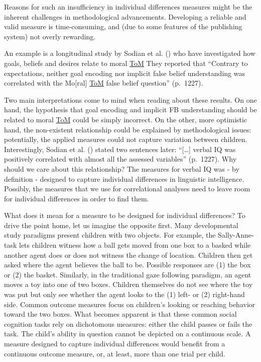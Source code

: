 \documentclass[
]{scrbook}
\begin{document}
Reasons for such an insufficiency in individual differences measures might be the inherent challenges in methodological advancements. Developing a reliable and valid measure is time-consuming, and (due to some features of the publishing system) not overly rewarding.

An example is a longitudinal study by Sodian et al. () who have investigated how goals, beliefs and desires relate to moral \hyperref[acronyms_ToM]{ToM} They reported that ``Contrary to expectations, neither goal encoding nor implicit false belief understanding was correlated with the Mo{[}ral{]} \hyperref[acronyms_ToM]{ToM} false belief question'' (p.~1227).

Two main interpretations come to mind when reading about these results. On one hand, the hypothesis that goal encoding and implicit FB understanding should be related to moral \hyperref[acronyms_ToM]{ToM} could be simply incorrect. On the other, more optimistic hand, the non-existent relationship could be explained by methodological issues: potentially, the applied measures could not capture variation between children. Interestingly, Sodian et al. () stated two sentences later: ``{[}\ldots{]} verbal IQ was positively correlated with almost all the assessed variables'' (p.~1227). Why should we care about this relationship? The measures for verbal IQ was - by definition - designed to capture individual differences in linguistic intelligence. Possibly, the measures that we use for correlational analyses need to leave room for individual differences in order to find them.

What does it mean for a measure to be designed for individual differences? To drive the point home, let us imagine the opposite first. Many developmental study paradigms present children with two objects. For example, the Sally-Anne-task lets children witness how a ball gets moved from one box to a basked while another agent does or does not witness the change of location. Children then get asked where the agent believes the ball to be. Possible responses are (1) the box or (2) the basket. Similarly, in the traditional gaze following paradigm, an agent moves a toy into one of two boxes. Children themselves do not see where the toy was put but only see whether the agent looks to the (1) left- or (2) right-hand side. Common outcome measures focus on children's looking or reaching behavior toward the two boxes. What becomes apparent is that these common social cognition tasks rely on dichotomous measures: either the child passes or fails the task. The child's ability in question cannot be depicted on a continuous scale. A measure designed to capture individual differences would benefit from a continuous outcome measure, or, at least, more than one trial per child.
\end{document}
